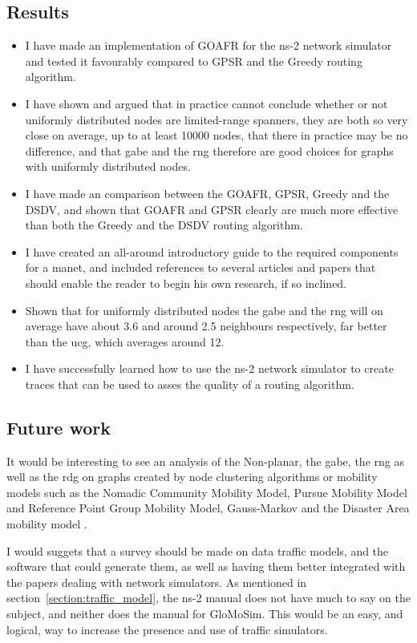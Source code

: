 \subsection{Results}
\begin{itemize}
\item I have made an implementation of GOAFR for the ns-2 network simulator and tested it favourably compared to GPSR and the Greedy routing algorithm.
\item I have shown and argued that in practice cannot conclude whether or not uniformly distributed nodes are limited-range spanners, they are both so very close on average, up to at least 10000 nodes, that there in practice may be no difference, and that \ac{gabe} and the \ac{rng} therefore are good choices for graphs with uniformly distributed nodes.
\item I have made an comparison between the GOAFR, GPSR, Greedy and the DSDV, and shown that GOAFR  and GPSR clearly are much more effective than both the Greedy and the DSDV routing algorithm.
\item I have created an all-around introductory guide to the required components for a \ac{manet}, and included references to several articles and papers that should enable the reader to begin his own research, if so inclined.
\item Shown that for uniformly distributed nodes the \ac{gabe} and the \ac{rng} will on average have about 3.6 and around 2.5 neighbours respectively, far better than the \ac{ucg}, which averages around 12.
\item I have successfully learned how to use the ns-2 network simulator to create traces that can be used to asses the quality of a routing algorithm.
\end{itemize}

\subsection{Future work}
\label{section:future_work}
It would be interesting to see an analysis of the Non-planar, the \ac{gabe}, the \ac{rng} as well as the \ac{rdg} on graphs created by node clustering algorithms or mobility models such as the Nomadic Community Mobility Model, Pursue Mobility Model and Reference Point Group Mobility Model, Gauss-Markov \cite{MobilityAdHocResearch} and the Disaster Area mobility model \cite{disasterArea}.

I would suggets that a survey should be made on data traffic models, and the software that could generate them, as well as having them better integrated with the papers dealing with network simulators. As mentioned in section~\ref{section:traffic_model}, the ns-2 manual does not have much to say on the subject, and neither does the manual for GloMoSim. This would be an easy, and logical, way to increase the presence and use of traffic simulators.

